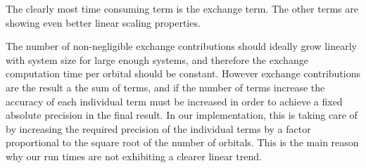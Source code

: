 \documentclass{article}
\begin{document}


The clearly most time consuming term is the exchange term. The other terms are showing even better linear scaling properties.

The number of non-negligible exchange contributions should ideally grow linearly with system size for large enough systems, and therefore the exchange computation time per orbital should be constant. However exchange contributions are the result a the sum of terms, and if the number of terms increase the accuracy of each individual term must be increased in order to achieve a fixed absolute precision in the final result. In our implementation, this is taking care of by increasing the required precision of the individual terms by a factor proportional to the square root of the number of orbitals. This is the main reason why our run times are not exhibiting a clearer linear trend.

\end{document}
